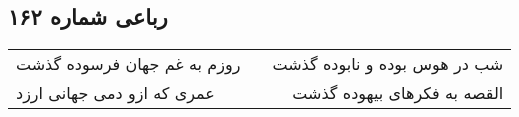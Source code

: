 \begin{center}
\section*{رباعی شماره ۱۶۲}
\label{sec:sh162}
\begin{longtable}{l p{0.5cm} r}
روزم به غم جهان فرسوده گذشت
&&
شب در هوس بوده و نابوده گذشت
\\
عمری که ازو دمی جهانی ارزد
&&
القصه به فکرهای بیهوده گذشت
\\
\end{longtable}
\end{center}
